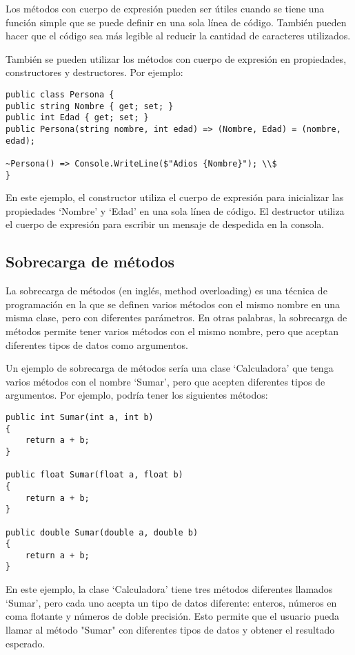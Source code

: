 \documentclass[executivepaper]{article}
\begin{document}
Los métodos con cuerpo de expresión pueden ser útiles cuando se tiene una función simple que se puede definir en una sola línea de código. También pueden hacer que el código sea más legible al reducir la cantidad de caracteres utilizados.

También se pueden utilizar los métodos con cuerpo de expresión en propiedades, constructores y destructores. Por ejemplo:

\begin{lstlisting}
public class Persona {
public string Nombre { get; set; }
public int Edad { get; set; }
public Persona(string nombre, int edad) => (Nombre, Edad) = (nombre, edad);

~Persona() => Console.WriteLine($"Adios {Nombre}"); \\$
}
\end{lstlisting}

En este ejemplo, el constructor utiliza el cuerpo de expresión para inicializar las propiedades \enquote*{Nombre} y \enquote*{Edad} en una sola línea de código. El destructor utiliza el cuerpo de expresión para escribir un mensaje de despedida en la consola.

\subsection{Sobrecarga de métodos}

La sobrecarga de métodos (en inglés, method overloading) es una técnica de programación en la que se definen varios métodos con el mismo nombre en una misma clase, pero con diferentes parámetros. En otras palabras, la sobrecarga de métodos permite tener varios métodos con el mismo nombre, pero que aceptan diferentes tipos de datos como argumentos.

Un ejemplo de sobrecarga de métodos sería una clase \enquote*{Calculadora} que tenga varios métodos con el nombre \enquote*{Sumar}, pero que acepten diferentes tipos de argumentos. Por ejemplo, podría tener los siguientes métodos:

\begin{lstlisting}
public int Sumar(int a, int b)
{
    return a + b;
}

public float Sumar(float a, float b)
{
    return a + b;
}

public double Sumar(double a, double b)
{
    return a + b;
}
\end{lstlisting}

En este ejemplo, la clase \enquote*{Calculadora} tiene tres métodos diferentes llamados \enquote*{Sumar}, pero cada uno acepta un tipo de datos diferente: enteros, números en coma flotante y números de doble precisión. Esto permite que el usuario pueda llamar al método "Sumar" con diferentes tipos de datos y obtener el resultado esperado.
\end{document}
